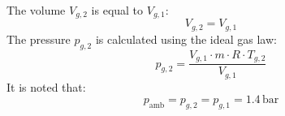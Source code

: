 The volume \( V_{g,2} \) is equal to \( V_{g,1} \):  
\[
V_{g,2} = V_{g,1}
\]  
The pressure \( p_{g,2} \) is calculated using the ideal gas law:  
\[
p_{g,2} = \frac{V_{g,1} \cdot m \cdot R \cdot T_{g,2}}{V_{g,1}}
\]  
It is noted that:  
\[
p_{\text{amb}} = p_{g,2} = p_{g,1} = 1.4 \, \text{bar}
\]
